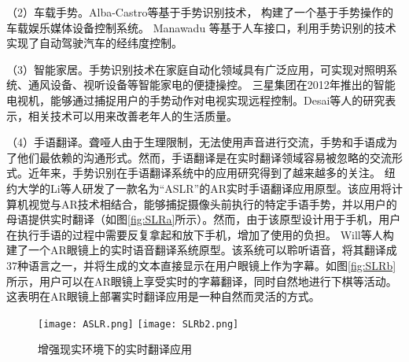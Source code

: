 （2）车载手势。Alba-Castro等基于手势识别技术， 构建了一个基于手势操作的车载娱乐媒体设备控制系统\cite{parada2014hand}。 Manawadu 等基于人车接口，利用手势识别的技术实现了自动驾驶汽车的经纬度控制\cite{manawadu2016hand}。

（3）智能家居。手势识别技术在家庭自动化领域具有广泛应用，可实现对照明系统、通风设备、视听设备等智能家电的便捷操控。
三星集团在2012年推出的智能电视机，能够通过捕捉用户的手势动作对电视实现远程控制。Desai等人的研究表示，相关技术可以用来改善老年人的生活质量\cite{desai2017human}。

（4）手语翻译。聋哑人由于生理限制，无法使用声音进行交流，手势和手语成为了他们最依赖的沟通形式。然而，手语翻译是在实时翻译领域容易被忽略的交流形式\cite{SLR1}。近年来，手势识别在手语翻译系统中的应用研究得到了越来越多的关注\cite{伍杰2019基于视觉的实时手势识别方法研究}。
纽约大学的Li等人研发了一款名为“ASLR”的AR实时手语翻译应用原型\cite{SLR1}。该应用将计算机视觉与AR技术相结合，能够捕捉摄像头前执行的特定手语手势，并以用户的母语提供实时翻译（如图\ref{fig:SLRa}所示）。然而，由于该原型设计用于手机，用户在执行手语的过程中需要反复拿起和放下手机，增加了使用的负担。
Will等人构建了一个AR眼镜上的实时语音翻译系统原型\cite{SLR2}。该系统可以聆听语音，将其翻译成37种语言之一，并将生成的文本直接显示在用户眼镜上作为字幕。如图\ref{fig:SLRb}所示，用户可以在AR眼镜上享受实时的字幕翻译，同时自然地进行下棋等活动。这表明在AR眼镜上部署实时翻译应用是一种自然而灵活的方式。

\begin{figure}
  \centering
    {\texttt{[image: ASLR.png]}}
    {\texttt{[image: SLRb2.png]}}
  \caption{增强现实环境下的实时翻译应用}
  \label{fig:SLR}
\end{figure}

